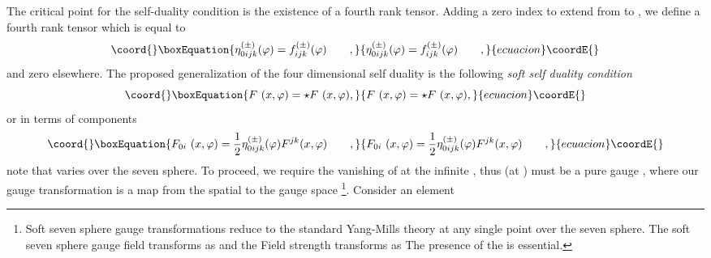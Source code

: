 \documentclass[a4paper,12pt]{book}
\begin{document}
The critical point for the self-duality condition is the existence of a
fourth rank tensor. Adding a zero index to extend \coordHE{} from \coordHE{} to \coordHE{}, we define a
fourth rank tensor \myHighlight{$\eta _{\alpha \beta \mu \nu }({\varphi })$}\coordHE{} which is
equal to 
\begin{equation}\coord{}\boxEquation{
\eta _{0ijk}^{\left( \pm \right) }({\varphi })=f_{ijk}^{\left( \pm \right) }(
{\varphi })\qquad ,  \label{sel}
}{
\eta _{0ijk}^{\left( \pm \right) }({\varphi })=f_{ijk}^{\left( \pm \right) }(
{\varphi })\qquad ,  }{ecuacion}\coordE{}\end{equation}
and zero elsewhere. The proposed generalization of the four dimensional self
duality is the following \emph{soft self duality condition} 
\begin{equation}\coord{}\boxEquation{
F{\ (x,{\varphi })}=\star F{\ (x,{\varphi })},
}{
F{\ (x,{\varphi })}=\star F{\ (x,{\varphi })},
}{ecuacion}\coordE{}\end{equation}
or in terms of components 
\begin{equation}\coord{}\boxEquation{
F_{0i}{\ (x,{\varphi })}=\frac{1}{2}\eta _{0ijk}^{\left( \pm \right) }({
\varphi })F^{jk}(x,{\varphi })\qquad ,  \label{a3}
}{
F_{0i}{\ (x,{\varphi })}=\frac{1}{2}\eta _{0ijk}^{\left( \pm \right) }({
\varphi })F^{jk}(x,{\varphi })\qquad ,  }{ecuacion}\coordE{}\end{equation}
note that \myHighlight{$\eta _{\alpha \beta \mu \nu }({\varphi })$}\coordHE{} varies over the seven
sphere. To proceed, we require the vanishing of \coordHE{} at the
infinite \coordHE{}, thus \coordHE{} (at \coordHE{}) must be a
pure gauge \coordHE{}%
, where our gauge transformation \coordHE{} is a map from the
spatial \coordHE{} to the gauge space \coordHE{} \footnote{%
Soft seven sphere gauge transformations reduce to the standard Yang-Mills
theory at any single point over the seven sphere. The soft seven sphere
gauge field \coordHE{} transforms as \coordHE{} and the Field strength \coordHE{} transforms
as \coordHE{} The presence of the \myHighlight{$\varphi $}\coordHE{} is
essential.}. Consider an \coordHE{} element 
\end{document}
